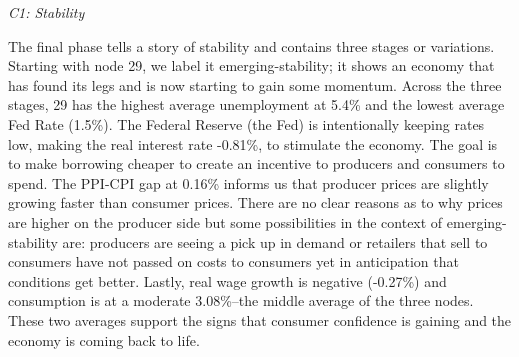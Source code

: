 \documentclass[10pt, letterpaper]{article}
\begin{document}
\begin{table}[H]


\caption{\label{tbl-Discussion_Data}Data used to review nodes, included
additional data that was excluded from our point cloud.}

\end{table}%

\emph{C1: Stability}

The final phase tells a story of stability and contains three stages or
variations. Starting with node 29, we label it emerging-stability; it
shows an economy that has found its legs and is now starting to gain
some momentum. Across the three stages, 29 has the highest average
unemployment at 5.4\% and the lowest average Fed Rate (1.5\%). The
Federal Reserve (the Fed) is intentionally keeping rates low, making the
real interest rate -0.81\%, to stimulate the economy. The goal is to
make borrowing cheaper to create an incentive to producers and consumers
to spend. The PPI-CPI gap at 0.16\% informs us that producer prices are
slightly growing faster than consumer prices. There are no clear reasons
as to why prices are higher on the producer side but some possibilities
in the context of emerging-stability are: producers are seeing a pick up
in demand or retailers that sell to consumers have not passed on costs
to consumers yet in anticipation that conditions get better. Lastly,
real wage growth is negative (-0.27\%) and consumption is at a moderate
3.08\%--the middle average of the three nodes. These two averages
support the signs that consumer confidence is gaining and the economy is
coming back to life.
\end{document}
